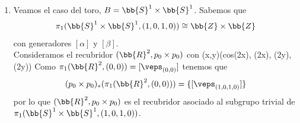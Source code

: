 \begin{ejemplo}
\begin{enumerate}
        Buscamos ahora los recubridores cuyo subgrupo asociado es $H_k$.  Con la misma idea que en el ejemplo anterior definimos la función $p_k$ para $k\in \bb{Z}^+$ dada por 
             {(\cos(\theta), \sen(\theta), y)}{(\cos(k\theta), \sen(k\theta), y)}
        Al igual que en el ejemplo anterior tenemos que 
        \begin{gather*}
            p_{k*}([\alpha]) = [\alpha]^k\\
            p_{k*}(\pi_1(\bb{S}^1 \times \bb{R}, (1,0,0))) = \{[\alpha]^{kn} : n\in \bb{Z}\} = H_k
        \end{gather*}
        Por tanto los únicos recubridores del cilindro $\bb{S}^1\times \bb{R}$ son 
        \begin{gather*}
            (\bb{R}^2, p_0) \text{ con } p_0(x,y) = (\cos(2\pi x), \sen(2\pi x), y)\\
            (\bb{S}^1\times \bb{R}, p_k) \text{ con } p_k(\cos(\theta), \sen(\theta), y) = (\cos(k\theta), \sen(k\theta), y) \text{ para todo } k\in \bb{Z}^+
        \end{gather*}

        \item Veamos el caso del toro, $B=\bb{S}^1 \times \bb{S}^1$. Sabemos que 
        \begin{gather*}
            \pi_1(\bb{S}^1\times \bb{S}^1, (1,0,1,0)) \cong \bb{Z}\times \bb{Z}
        \end{gather*}
        con generadores $[\alpha]$ y $[\beta]$.\\

        Consideramos el recubridor $(\bb{R}^2, p_0\times p_0)$ con 
             {(x,y)}{(cos(2\pi x), \sen(2\pi x), \cos(2\pi y), \sen(2\pi y))}
        Como $\pi_1(\bb{R}^2, (0,0)) = [\veps_{(0,0)}]$ tenemos que 
        \begin{gather*}
            (p_0\times p_0)_*(\pi_1(\bb{R}^2, (0,0))) = \{[\veps_{(1,0,1,0)}]\}
        \end{gather*}
        por lo que $(\bb{R}^2, p_0\times p_0)$ es el recubridor asociado al subgrupo trivial de $\pi_1(\bb{S}^1\times \bb{S}^1, (1,0,1,0))$.\\


\end{enumerate}
\end{ejemplo}
